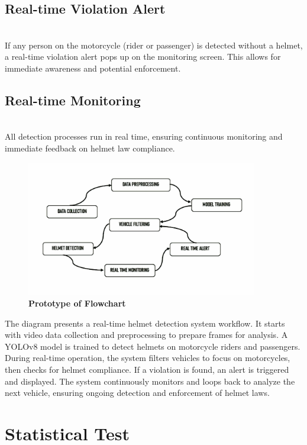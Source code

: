\begin{refsection}
    \subsection {Real-time Violation Alert} \\
    If any person on the motorcycle (rider or passenger) is detected without a helmet, a real-time violation alert pops up on the monitoring screen. This allows for immediate awareness and potential enforcement.


    \subsection {Real-time Monitoring} \\
    All detection processes run in real time, ensuring continuous monitoring and immediate feedback on helmet law compliance.


\begin{figure}[H]
    \centering
    \includegraphics[width=0.9\textwidth]{figures/Fig 5.jpg}
    \caption{\textbf{Prototype of Flowchart}}
    \label{figures/Fig 5.jpg}
\end{figure}


The diagram presents a real-time helmet detection system workflow. It starts with video data collection and preprocessing to prepare frames for analysis. A YOLOv8 model is trained to detect helmets on motorcycle riders and passengers. During real-time operation, the system filters vehicles to focus on motorcycles, then checks for helmet compliance. If a violation is found, an alert is triggered and displayed. The system continuously monitors and loops back to analyze the next vehicle, ensuring ongoing detection and enforcement of helmet laws.


\section*{Statistical Test}



\end{refsection}
